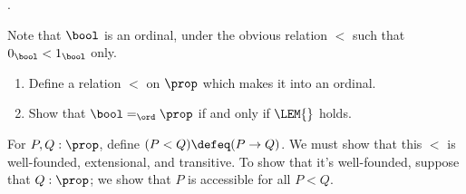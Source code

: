 \begin{coqdoccode}
\coqdocnoindent
{}.\coqdoceol
\coqdocemptyline
\coqdocemptyline
\coqdocemptyline
\coqdocemptyline
\end{coqdoccode}
   
Note that $\bool$ is an ordinal, under the obvious relation $<$ such that
$0_{\bool} < 1_{\bool}$ only.
\begin{enumerate}
  \item Define a relation $<$ on $\prop$ which makes it into an ordinal.
  \item Show that $\bool =_{\ord} \prop$ if and only if $\LEM{}$ holds.
\end{enumerate}


 \soln
For $P, Q : \prop$, define $(P < Q) \defeq (P \to Q)$.  We must show that this
$<$ is well-founded, extensional, and transitive.  To show that it's
well-founded, suppose that $Q : \prop$; we show that $P$ is accessible for all
$P < Q$.


            \begin{coqdoccode}
\end{coqdoccode}
